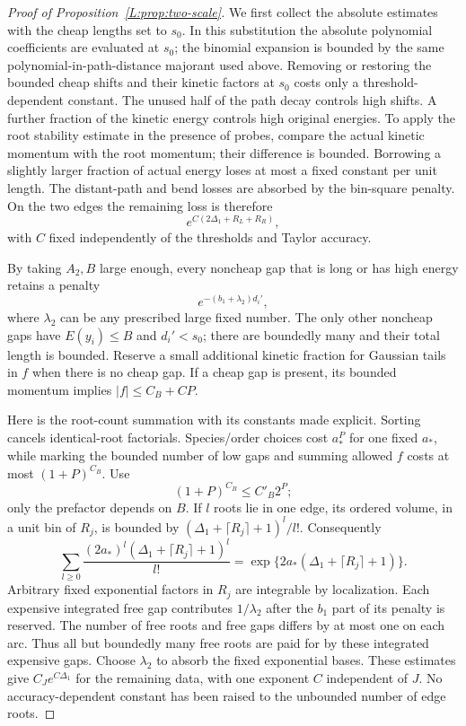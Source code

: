 \begin{proof}[Proof of Proposition~\ref{L:prop:two-scale}]
We first collect the absolute estimates with the cheap lengths set
to $s_0$. In this substitution the absolute polynomial coefficients
are evaluated at $s_0$; the binomial expansion is bounded by the same
polynomial-in-path-distance majorant used above. Removing or restoring
the bounded cheap shifts and their kinetic factors at $s_0$ costs only
a threshold-dependent constant. The unused half of the path decay
controls high shifts. A further fraction of the kinetic energy
controls high original energies. To apply the root stability estimate
in the presence of probes, compare the actual kinetic momentum with
the root momentum; their difference is bounded. Borrowing a slightly
larger fraction of actual energy loses at most a fixed constant per
unit length. The distant-path and bend losses are absorbed by the
bin-square penalty. On the two edges the remaining loss is therefore
\[
              e^{C(2\Delta_1+R_L+R_R)},
\]
with $C$ fixed independently of the thresholds and Taylor accuracy.

By taking $A_2,B$ large enough, every noncheap gap that is long or
has high energy retains a penalty
\[
                   e^{-(b_1+\lambda_2)d_i'},
\]
where $\lambda_2$ can be any prescribed large fixed number. The only
other noncheap gaps have $E(y_i)\le B$ and $d_i'<s_0$; there are
boundedly many and their total length is bounded. Reserve a small
additional kinetic fraction for Gaussian tails in $f$ when there is
no cheap gap. If a cheap gap is present, its bounded momentum implies
$|f|\le C_B+CP$.

Here is the root-count summation with its constants made explicit.
Sorting cancels identical-root factorials. Species/order choices cost
$a_*^P$ for one fixed $a_*$, while marking the bounded number of low gaps
and summing allowed $f$ costs at most $(1+P)^{C_B}$. Use
\[
       (1+P)^{C_B}\le C'_B2^P;
\]
only the prefactor depends on $B$. If $l$ roots lie in one edge,
its ordered volume, in a unit bin of $R_j$, is bounded by
$(\Delta_1+\lceil R_j\rceil+1)^l/l!$. Consequently
\[
 \sum_{l\ge0}\frac{(2a_*)^l(\Delta_1+\lceil R_j\rceil+1)^l}{l!}
 =\exp\{2a_*(\Delta_1+\lceil R_j\rceil+1)\}.
\]
Arbitrary fixed exponential factors in $R_j$ are integrable by
localization. Each expensive integrated free gap contributes
$1/\lambda_2$ after the $b_1$ part of its penalty is reserved.
The number of free roots and free gaps differs by at most one on each
arc. Thus all but boundedly many free roots are paid for by these
integrated expensive gaps. Choose $\lambda_2$
to absorb the fixed exponential bases. These estimates give
$C_J e^{C\Delta_1}$ for the remaining data, with one exponent $C$
independent of $J$. No accuracy-dependent constant has been raised
to the unbounded number of edge roots.


\end{proof}
